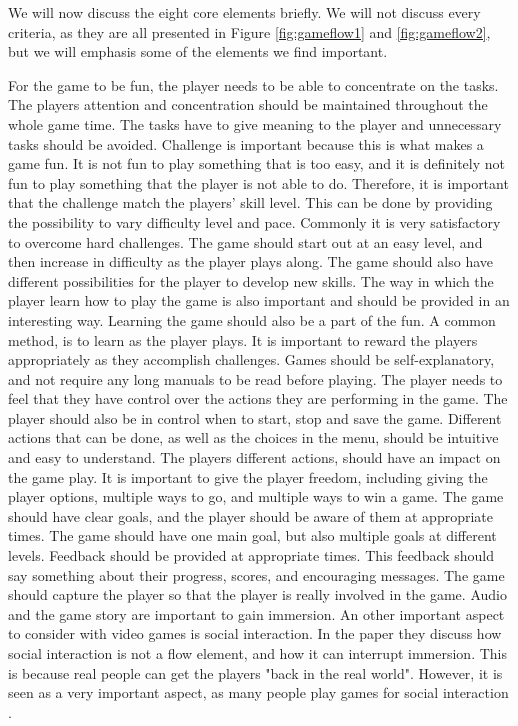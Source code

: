 We will now discuss the eight core elements briefly. We will not discuss every criteria, as they are all presented in Figure \ref{fig:gameflow1} and \ref{fig:gameflow2}, but we will emphasis some of the elements we find important. 

For the game to be fun, the player needs to be able to concentrate on the tasks. The players attention and concentration should be maintained throughout the whole game time. The tasks have to give meaning to the player and unnecessary tasks should be avoided. Challenge is important because this is what makes a game fun. It is not fun to play something that is too easy, and it is definitely not fun to play something that the player is not able to do. Therefore, it is important that the challenge match the players' skill level. This can be done by providing the possibility to vary difficulty level and pace. Commonly it is very satisfactory to overcome hard challenges. The game should start out at an easy level, and then increase in difficulty as the player plays along. The game should also have different possibilities for the player to develop new skills. The way in which the player learn how to play the game is also important and should be provided in an interesting way. Learning the game should also be a part of the fun. A common method, is to learn as the player plays. It is important to reward the players appropriately as they accomplish challenges.  Games should be self-explanatory, and not require any long manuals to be read before playing. The player needs to feel that they have control over the actions they are performing in the game. The player should also be in control when to start, stop and save the game. Different actions that can be done, as well as the choices in the menu, should be intuitive and easy to understand. The players different actions, should have an impact on the game play. It is important to give the player freedom, including giving the player options, multiple ways to go, and multiple ways to win a game. The game should have clear goals, and the player should be aware of them at appropriate times. The game should have one main goal, but also multiple goals at different levels. Feedback should be provided at appropriate times. This feedback should say something about their progress, scores, and encouraging messages. The game should capture the player so that the player is really involved in the game. Audio and the game story are important to gain immersion. An other important aspect to consider with video games is social interaction. In the paper they discuss how social interaction is not a flow element, and how it can interrupt immersion. This is because real people can get the players "back in the real world". However, it is seen as a very important aspect, as many people play games for social interaction \cite{sweetser}.

